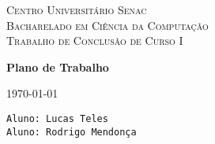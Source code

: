 \documentclass[12pt]{article}
\begin{document}
\begin{center}
\textsc{Centro Universitário Senac} \\
\textsc{Bacharelado em Ciência da Computação} \\
\textsc{Trabalho de Conclusão de Curso I} \\
\end{center}

\vspace{.3cm}

\centerline{\textbf{Plano de Trabalho}}

\vspace{.25cm}

\centerline{\today}

\vspace{.25cm}

\noindent
\texttt{Aluno: Lucas Teles} \\
\texttt{Aluno: Rodrigo Mendonça}

\vspace{.25cm}
\end{document}
